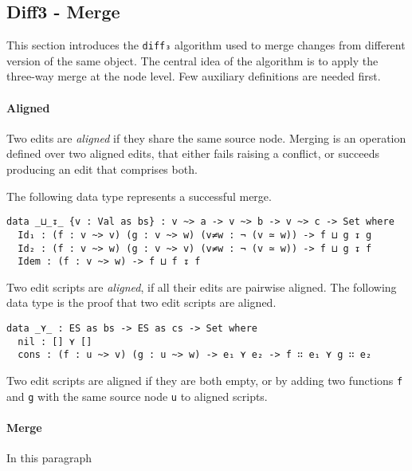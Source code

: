 \documentclass[../Thesis.tex]{subfiles}
\begin{document}
	\subsection{Diff3 - Merge} 
	\label{subsec:diff3}

	This section introduces the \texttt{diff₃} algorithm used to merge
	changes from different version of the same object.
	The central idea of the algorithm is to apply the three-way merge at the 
	node level. Few auxiliary definitions are needed first.
	
	\paragraph{Aligned}
	Two edits are \emph{aligned} if they share the same source node.	
	Merging is an operation defined over two aligned edits, that either fails 
	raising a conflict, or succeeds producing an edit that comprises both. 

	The following data type represents a successful merge.

\begin{verbatim}	
data _⊔_↧_ {v : Val as bs} : v ~> a -> v ~> b -> v ~> c -> Set where
  Id₁ : (f : v ~> v) (g : v ~> w) (v≠w : ¬ (v ≃ w)) -> f ⊔ g ↧ g
  Id₂ : (f : v ~> w) (g : v ~> v) (v≠w : ¬ (v ≃ w)) -> f ⊔ g ↧ f
  Idem : (f : v ~> w) -> f ⊔ f ↧ f
\end{verbatim}

	Two edit scripts are \emph{aligned}, if all their edits are pairwise aligned.	
	The following data type is the proof that two edit scripts are aligned.	
\begin{verbatim}
data _⋎_ : ES as bs -> ES as cs -> Set where
  nil : [] ⋎ []
  cons : (f : u ~> v) (g : u ~> w) -> e₁ ⋎ e₂ -> f ∷ e₁ ⋎ g ∷ e₂ 
\end{verbatim}

	Two edit scripts are aligned if they are both empty, or by adding
	two functions \texttt{f} and \texttt{g} with the same source node
	\texttt{u} to aligned scripts.
	
	\paragraph{Merge}
	In this paragraph 
	
	
	
		
\end{document}
